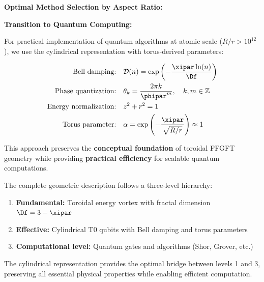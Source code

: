 \textbf{Optimal Method Selection by Aspect Ratio:}

\begin{table}[h]
	\centering
	\caption{Recommended approach by system scale}
	\label{tab:method_by_scale}
\end{table}

\textbf{Transition to Quantum Computing:}

For practical implementation of quantum algorithms at atomic scale ($R/r > 10^{12}$), we use the cylindrical representation with torus-derived parameters:

\begin{align}
	\text{Bell damping:} \quad & \mathcal{D}(n) = \exp\left(-\frac{\xipar\ln(n)}{\Df}\right) \\
	\text{Phase quantization:} \quad & \theta_k = \frac{2\pi k}{\phipar^m}, \quad k,m \in \mathbb{Z} \\
	\text{Energy normalization:} \quad & z^2 + r^2 = 1 \\
	\text{Torus parameter:} \quad & \alpha = \exp\left(-\frac{\xipar}{\sqrt{R/r}}\right) \approx 1
\end{align}

This approach preserves the \textbf{conceptual foundation} of toroidal FFGFT geometry while providing \textbf{practical efficiency} for scalable quantum computations.

\begin{remark}
	The complete geometric description follows a three-level hierarchy:
	\begin{enumerate}
		\item \textbf{Fundamental:} Toroidal energy vortex with fractal dimension $\Df=3-\xipar$
		\item \textbf{Effective:} Cylindrical T0 qubits with Bell damping and torus parameters
		\item \textbf{Computational level:} Quantum gates and algorithms (Shor, Grover, etc.)
	\end{enumerate}
	The cylindrical representation provides the optimal bridge between levels 1 and 3, preserving all essential physical properties while enabling efficient computation.
\end{remark}

